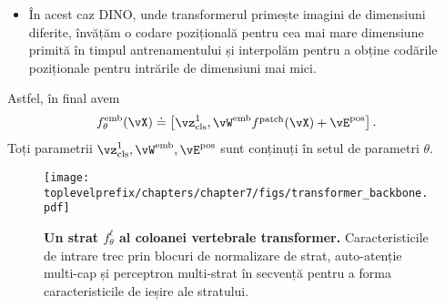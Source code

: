 \documentclass[../../book-main_ro.tex]{subfiles}
\begin{document}
\begin{enumerate}
\begin{itemize}
        \begin{itemize}
            \item În acest caz DINO, unde transformerul primește imagini de dimensiuni diferite, învățăm o codare pozițională pentru cea mai mare dimensiune primită în timpul antrenamentului și interpolăm pentru a obține codările poziționale pentru intrările de dimensiuni mai mici.
        \end{itemize}
    \end{itemize}
\end{enumerate}
Astfel, în final avem 
\begin{equation}\label{eq:definition_of_embedding_module}
    f_{\theta}^{\emb}(\vX) \doteq \mat{\vz_{\cls}^{1}, \vW^{\emb}f^{\patch}(\vX) + \vE^{\pos}}.
\end{equation}
Toți parametrii \(\vz_{\cls}^{1}, \vW^{\emb}, \vE^{\pos}\) sunt conținuți în setul de parametri \(\theta\).

\begin{figure}
    \centering 
    \texttt{[image: \\toplevelprefix/chapters/chapter7/figs/transformer\_backbone.pdf]}
    \caption{\small\textbf{Un strat \(f_{\theta}^{\ell}\) al coloanei vertebrale transformer.} Caracteristicile de intrare trec prin blocuri de normalizare de strat, auto-atenție multi-cap și perceptron multi-strat în secvență pentru a forma caracteristicile de ieșire ale stratului.}
    \label{fig:transformer_backbone}
\end{figure}
\end{document}
